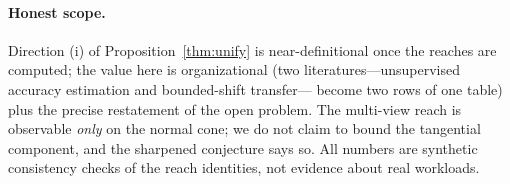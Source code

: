 \paragraph{Honest scope.} Direction (i) of Proposition~\ref{thm:unify} is
near-definitional once the reaches are computed; the value here is organizational
(two literatures---unsupervised accuracy estimation and bounded-shift transfer---
become two rows of one table) plus the precise restatement of the open problem.
The multi-view reach is observable \emph{only} on the normal cone; we do not claim
to bound the tangential component, and the sharpened conjecture says so. All
numbers are synthetic consistency checks of the reach identities, not evidence
about real workloads.
